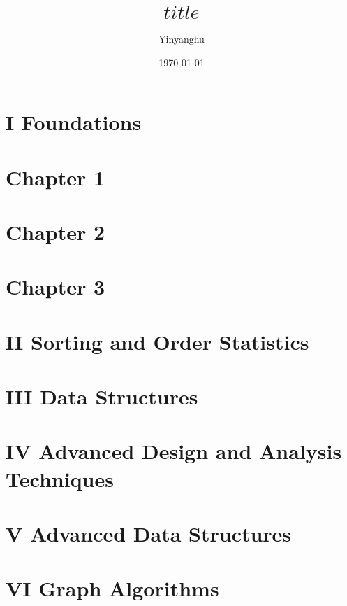 \documentclass[11pt,a4paper]{book}
\title{$title$}
\author{Yinyanghu}
\date{\today}
\begin{document}

\frontmatter
\maketitle

\tableofcontents
\listoffigures
\listoftables

\mainmatter


\section*{I Foundations}
\pagebreak

\section*{Chapter 1}

\pagebreak

\section*{Chapter 2}

\pagebreak


\section*{Chapter 3}

\pagebreak

\section*{II Sorting and Order Statistics}
\pagebreak


\section*{III Data Structures}
\pagebreak


\section*{IV Advanced Design and Analysis Techniques}
\pagebreak

\section*{V Advanced Data Structures}
\pagebreak


\section*{VI Graph Algorithms}
\pagebreak
\end{document}
